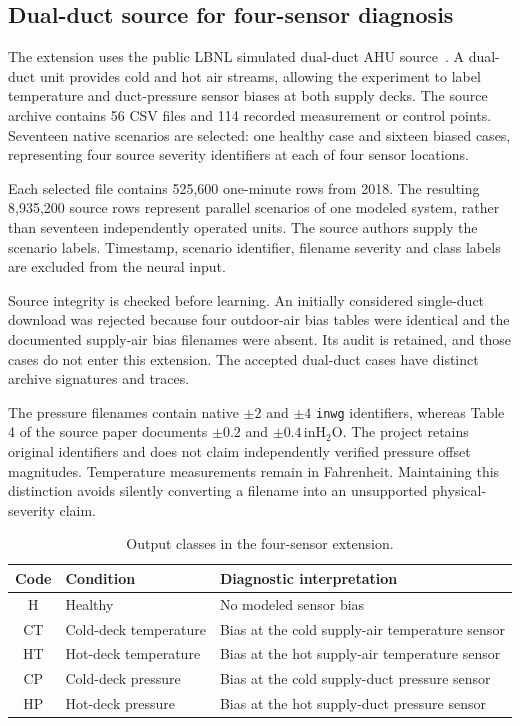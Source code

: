 \subsection{Dual-duct source for four-sensor diagnosis}
The extension uses the public LBNL simulated dual-duct AHU source~\cite{lbnl2022,granderson2023}. A dual-duct unit provides cold and hot air streams, allowing the experiment to label temperature and duct-pressure sensor biases at both supply decks. The source archive contains 56 CSV files and 114 recorded measurement or control points. Seventeen native scenarios are selected: one healthy case and sixteen biased cases, representing four source severity identifiers at each of four sensor locations.

Each selected file contains 525,600 one-minute rows from 2018. The resulting 8,935,200 source rows represent parallel scenarios of one modeled system, rather than seventeen independently operated units. The source authors supply the scenario labels. Timestamp, scenario identifier, filename severity and class labels are excluded from the neural input.

Source integrity is checked before learning. An initially considered single-duct download was rejected because four outdoor-air bias tables were identical and the documented supply-air bias filenames were absent. Its audit is retained, and those cases do not enter this extension. The accepted dual-duct cases have distinct archive signatures and traces.

The pressure filenames contain native $\pm2$ and $\pm4$ \texttt{inwg} identifiers, whereas Table 4 of the source paper documents $\pm0.2$ and $\pm0.4\,\mathrm{inH_2O}$. The project retains original identifiers and does not claim independently verified pressure offset magnitudes. Temperature measurements remain in Fahrenheit. Maintaining this distinction avoids silently converting a filename into an unsupported physical-severity claim.

\begin{table}[htbp]\centering\small
\caption{Output classes in the four-sensor extension.}\label{tab:classes}
\begin{tabularx}{\linewidth}{c l X}
\toprule
Code & Condition & Diagnostic interpretation \\
\midrule
H & Healthy & No modeled sensor bias \\
CT & Cold-deck temperature & Bias at the cold supply-air temperature sensor \\
HT & Hot-deck temperature & Bias at the hot supply-air temperature sensor \\
CP & Cold-deck pressure & Bias at the cold supply-duct pressure sensor \\
HP & Hot-deck pressure & Bias at the hot supply-duct pressure sensor \\
\bottomrule\end{tabularx}
\end{table}

